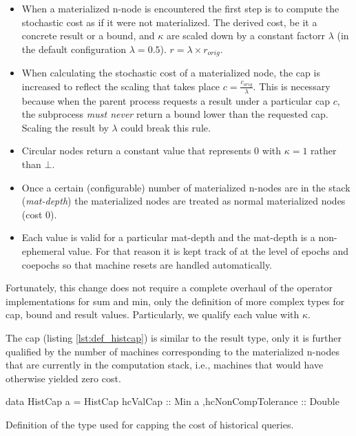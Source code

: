 \begin{itemize}
\item When a materialized n-node is encountered the first step is to
  compute the stochastic cost as if it were not materialized. The
  derived cost, be it a concrete result or a bound, and \(\kappa\) are
  scaled down by a constant factorr \(\lambda\) (in the default
  configuration \(\lambda = 0.5\)).  \(r = \lambda \times r_{orig}\).
\item When calculating the stochastic cost of a materialized node, the
  cap is increased to reflect the scaling that takes place
  \(c = \frac{c_{orig}}{\lambda}\). This is necessary because when the
  parent process requests a result under a particular cap \(c\), the
  subprocess \emph{must never} return a bound lower than the requested
  cap. Scaling the result by \(\lambda\) could break this rule.
\item Circular nodes return a constant value that represents 0 with
  \(\kappa = 1\) rather than \(\bot\).
\item Once a certain (configurable) number of materialized n-nodes are
  in the stack (\emph{mat-depth}) the materialized nodes are treated
  as normal materialized nodes (cost 0).
\item Each value is valid for a particular mat-depth and the mat-depth
  is a non-ephemeral value. For that reason it is kept track of at the
  level of epochs and coepochs so that machine resets are handled
  automatically.
\end{itemize}

Fortunately, this change does not require a complete overhaul of the
operator implementations for sum and min, only the definition of more
complex types for cap, bound and result values. Particularly, we
qualify each value with \(\kappa\).

The cap (listing \ref{lst:def_histcap}) is similar to the result type,
only it is further qualified by the number of machines corresponding
to the materialized n-nodes that are currently in the computation
stack, i.e., machines that would have otherwise yielded zero cost.

\begin{code}
\begin{haskellcode}
data HistCap a =
  HistCap
  { hcValCap :: Min a
   ,hcNonCompTolerance :: Double
  }
\end{haskellcode}
  \caption{\label{lst:def_histcap}Definition of the type used for
    capping the cost of historical queries.}
\end{code}

